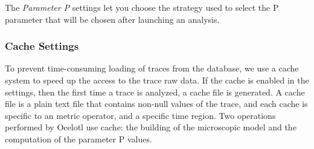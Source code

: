 \documentclass[twoside]{article}
\begin{document}
\begin{sloppypar}
The \textit{Parameter P} settings let you choose the strategy used to select the P parameter that will be chosen after launching an analysis.

\subsubsection{Cache Settings}
To prevent time-consuming loading of traces from the database, we use a cache system to speed up the access to the trace raw data. If the cache is enabled in the settings, then the first time a trace is analyzed, a cache file is generated. A cache file is a plain text file that contains non-null values of the trace, and each cache is specific to an metric operator, and a specific time region. Two operations performed by Ocelotl use cache: the building of the microscopic model and the computation of the parameter P values. 


\end{sloppypar}
\end{document}
